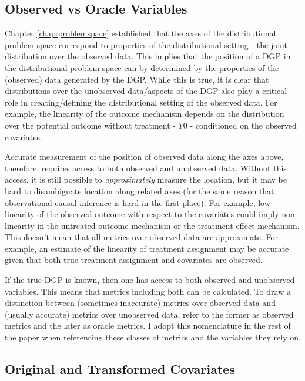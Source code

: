 \documentclass[../main.tex]{subfiles}
\begin{document}
\subsection{Observed vs Oracle Variables}

Chapter \ref{chap:problemspace} established that the axes of the distributional problem space correspond to properties of the distributional setting - the joint distribution over the observed data. This implies that the position of a DGP in the distributional problem space can by determined by the properties of the (observed) data generated by the DGP. While this is true, it is clear that distributions over the unobserved data/aspects of the DGP also play a critical role in creating/defining the distributional setting of the observed data. For example, the linearity of the outcome mechanism depends on the distribution over the potential outcome without treatment - $Y0$ - conditioned on the observed covariates.

\vspace{\baselineskip}

Accurate measurement of the position of observed data along the axes above, therefore, requires access to both observed and unobserved data. Without this access, it is still possible to \textit{approximately} measure the location, but it may be hard to disambiguate location along related axes (for the same reason that observational causal inference is hard in the first place). For example, low linearity of the observed outcome with respect to the covariates could imply non-linearity in the untreated outcome mechanism or the treatment effect mechanism. This doesn't mean that all metrics over observed data are approximate. For example, an estimate of the linearity of treatment assignment may be accurate given that both true treatment assignment and covariates are observed.

\vspace{\baselineskip}

If the true DGP is known, then one has access to both observed and unobserved variables. This means that metrics including both can be calculated. To draw a distinction between (sometimes inaccurate) metrics over observed data and (usually accurate) metrics over unobserved data, \textcite{Dorie2019Automated1} refer to the former as observed metrics and the later as oracle metrics. I adopt this nomenclature in the rest of the paper when referencing these classes of metrics and the variables they rely on.

\subsection{Original and Transformed Covariates}
\end{document}
